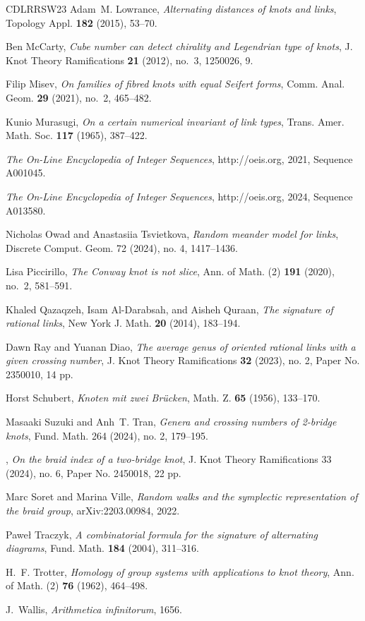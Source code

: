 \documentclass[12pt]{amsart}
\theoremstyle{definition}
\theoremstyle{remark}
\numberwithin{equation}{section}
\begin{document}
\begin{thebibliography}{CDLRRSW23}
Adam~M. Lowrance, \emph{Alternating distances of knots and links}, Topology
  Appl. \textbf{182} (2015), 53--70.

Ben McCarty, \emph{Cube number can detect chirality and {L}egendrian type of
  knots}, J. Knot Theory Ramifications \textbf{21} (2012), no.~3, 1250026, 9.

Filip Misev, \emph{On families of fibred knots with equal {S}eifert forms},
  Comm. Anal. Geom. \textbf{29} (2021), no.~2, 465--482.

Kunio Murasugi, \emph{On a certain numerical invariant of link types}, Trans.
  Amer. Math. Soc. \textbf{117} (1965), 387--422. 

\emph{The {O}n-{L}ine {E}ncyclopedia of {I}nteger {S}equences},
  http://oeis.org, 2021, Sequence A001045.

\emph{The {O}n-{L}ine {E}ncyclopedia of {I}nteger {S}equences},
  http://oeis.org, 2024, Sequence A013580.

Nicholas Owad and Anastasiia Tsvietkova, \emph{Random meander model for links},
Discrete Comput. Geom. 72 (2024), no. 4, 1417--1436.

Lisa Piccirillo, \emph{The {C}onway knot is not slice}, Ann. of Math. (2)
  \textbf{191} (2020), no.~2, 581--591.

Khaled Qazaqzeh, Isam Al-Darabsah, and Aisheh Quraan, \emph{The signature of
  rational links}, New York J. Math. \textbf{20} (2014), 183--194.

Dawn Ray and Yuanan Diao, \emph{The average genus of oriented rational links
  with a given crossing number}, J. Knot Theory Ramifications \textbf{32} (2023), no. 2, Paper No. 2350010, 14 pp.

Horst Schubert, \emph{Knoten mit zwei {B}r\"ucken}, Math. Z. \textbf{65} (1956), 133--170.
  
Masaaki Suzuki and Anh~T. Tran, \emph{Genera and crossing numbers of 2-bridge knots}, Fund. Math. 264 (2024), no. 2, 179--195.

\bysame, \emph{On the braid index of a two-bridge knot}, J. Knot Theory Ramifications 33 (2024), no. 6, Paper No. 2450018, 22 pp.

Marc Soret and Marina Ville, \emph{Random walks and the symplectic
  representation of the braid group}, arXiv:2203.00984, 2022.

Pawe{\l} Traczyk, \emph{A combinatorial formula for the signature of
  alternating diagrams}, Fund. Math. \textbf{184} (2004), 311--316.

H.~F. Trotter, \emph{Homology of group systems with applications to knot
  theory}, Ann. of Math. (2) \textbf{76} (1962), 464--498.

J.~Wallis, \emph{Arithmetica infinitorum}, 1656.

\end{thebibliography}
\end{document}
